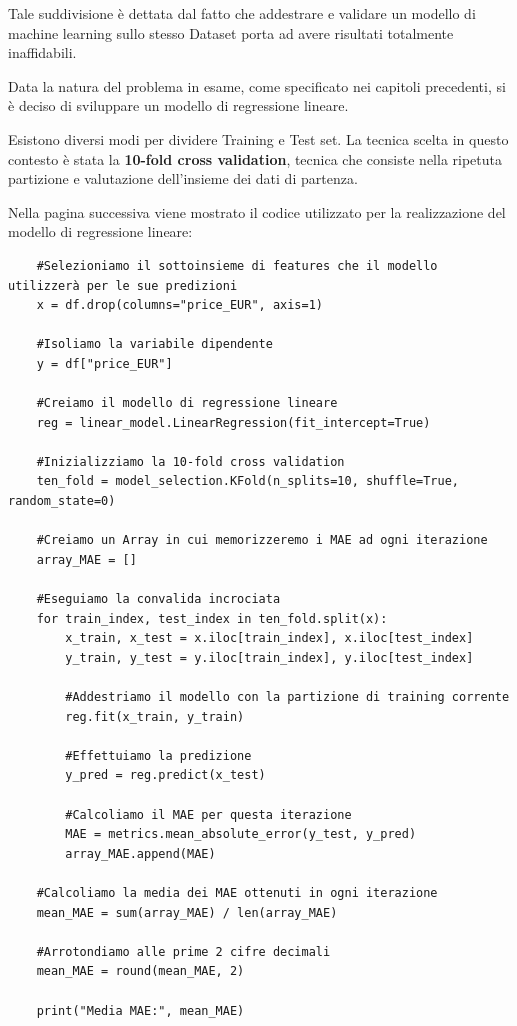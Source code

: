 Tale suddivisione è dettata dal fatto che addestrare e validare un modello di machine learning sullo stesso Dataset porta ad avere risultati totalmente inaffidabili.

Data la natura del problema in esame, come specificato nei capitoli precedenti, si è deciso di sviluppare un modello di regressione lineare. 

Esistono diversi modi per dividere Training e Test set. La tecnica scelta in questo contesto è stata la \textbf{10-fold cross validation}, tecnica che consiste nella ripetuta partizione e valutazione dell'insieme dei dati di partenza.

Nella pagina successiva viene mostrato il codice utilizzato per la realizzazione del modello di regressione lineare:
\pagebreak
    \begin{lstlisting}
    #Selezioniamo il sottoinsieme di features che il modello utilizzerà per le sue predizioni
    x = df.drop(columns="price_EUR", axis=1)

    #Isoliamo la variabile dipendente
    y = df["price_EUR"]

    #Creiamo il modello di regressione lineare
    reg = linear_model.LinearRegression(fit_intercept=True)

    #Inizializziamo la 10-fold cross validation
    ten_fold = model_selection.KFold(n_splits=10, shuffle=True, random_state=0)

    #Creiamo un Array in cui memorizzeremo i MAE ad ogni iterazione
    array_MAE = []

    #Eseguiamo la convalida incrociata
    for train_index, test_index in ten_fold.split(x):
        x_train, x_test = x.iloc[train_index], x.iloc[test_index]
        y_train, y_test = y.iloc[train_index], y.iloc[test_index]

        #Addestriamo il modello con la partizione di training corrente
        reg.fit(x_train, y_train)

        #Effettuiamo la predizione
        y_pred = reg.predict(x_test)

        #Calcoliamo il MAE per questa iterazione
        MAE = metrics.mean_absolute_error(y_test, y_pred)
        array_MAE.append(MAE)

    #Calcoliamo la media dei MAE ottenuti in ogni iterazione
    mean_MAE = sum(array_MAE) / len(array_MAE)

    #Arrotondiamo alle prime 2 cifre decimali
    mean_MAE = round(mean_MAE, 2)
    
    print("Media MAE:", mean_MAE)
    \end{lstlisting}
    \medskip
    
